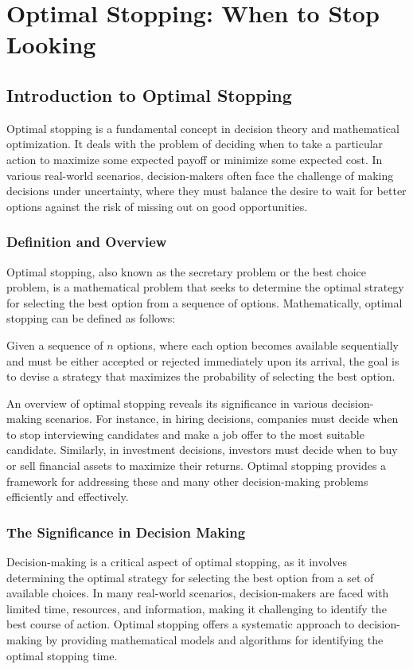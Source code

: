 \documentclass[12pt]{book} %
\begin{document}
\chapter{Optimal Stopping: When to Stop Looking}

\section{Introduction to Optimal Stopping}

Optimal stopping is a fundamental concept in decision theory and mathematical optimization. It deals with the problem of deciding when to take a particular action to maximize some expected payoff or minimize some expected cost. In various real-world scenarios, decision-makers often face the challenge of making decisions under uncertainty, where they must balance the desire to wait for better options against the risk of missing out on good opportunities.

\subsection{Definition and Overview}
Optimal stopping, also known as the secretary problem or the best choice problem, is a mathematical problem that seeks to determine the optimal strategy for selecting the best option from a sequence of options. Mathematically, optimal stopping can be defined as follows:

Given a sequence of $n$ options, where each option becomes available sequentially and must be either accepted or rejected immediately upon its arrival, the goal is to devise a strategy that maximizes the probability of selecting the best option.

An overview of optimal stopping reveals its significance in various decision-making scenarios. For instance, in hiring decisions, companies must decide when to stop interviewing candidates and make a job offer to the most suitable candidate. Similarly, in investment decisions, investors must decide when to buy or sell financial assets to maximize their returns. Optimal stopping provides a framework for addressing these and many other decision-making problems efficiently and effectively.

\subsection{The Significance in Decision Making}
Decision-making is a critical aspect of optimal stopping, as it involves determining the optimal strategy for selecting the best option from a set of available choices. In many real-world scenarios, decision-makers are faced with limited time, resources, and information, making it challenging to identify the best course of action. Optimal stopping offers a systematic approach to decision-making by providing mathematical models and algorithms for identifying the optimal stopping time.
\end{document}
